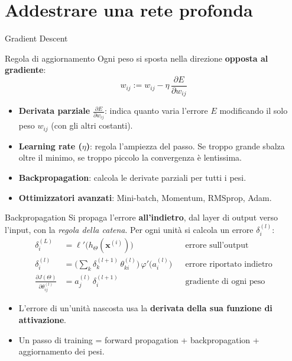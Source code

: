 \documentclass[aspectratio=169]{beamer}
\begin{document}
\section{Addestrare una rete profonda}
\begin{frame}{Gradient Descent}
  \small
  \begin{block}{Regola di aggiornamento}
    Ogni peso si sposta nella direzione \textbf{opposta al gradiente}:
    \[ w_{ij} := w_{ij} - \eta\,\frac{\partial E}{\partial w_{ij}} \]
  \end{block}

  \vspace{-0.1cm}
  
  \begin{itemize}
    \item \textbf{Derivata parziale} $\frac{\partial E}{\partial w_{ij}}$: indica quanto varia l'errore $E$ modificando il solo peso $w_{ij}$ (con gli altri costanti).
    \item \textbf{Learning rate ($\eta$)}: regola l'ampiezza del passo. Se troppo grande sbalza oltre il minimo, se troppo piccolo la convergenza è lentissima.
    \item \textbf{Backpropagation}: calcola le derivate parziali per tutti i pesi.
    \item \textbf{Ottimizzatori avanzati}: Mini-batch, Momentum, RMSprop, Adam.
  \end{itemize}
\end{frame}



\begin{frame}{Backpropagation}
  Si propaga l'errore \textbf{all'indietro}, dal layer di output verso l'input,
  con la \emph{regola della catena}. Per ogni unità si calcola un errore
  $\delta_i^{(l)}$:
  \begin{align*}
    \delta_i^{(L)} &= \ell'\big(h_\Theta(\mathbf{x}^{(i)})\big)
      && \text{errore sull'output} \\
    \delta_i^{(l)} &= \Big(\sum_k \delta_k^{(l+1)}\,\theta_{ki}^{(l)}\Big)\,
      \varphi'\big(a_i^{(l)}\big)
      && \text{errore riportato indietro} \\
    \frac{\partial J(\Theta)}{\partial \theta_{ij}^{(l)}} &=
      a_j^{(l)}\,\delta_i^{(l+1)}
      && \text{gradiente di ogni peso}
  \end{align*}
  \begin{itemize}
    \item L'errore di un'unità nascosta usa la \textbf{derivata della sua
          funzione di attivazione}.
    \item Un passo di training = forward propagation + backpropagation +
          aggiornamento dei pesi.
  \end{itemize}
\end{frame}
\end{document}
